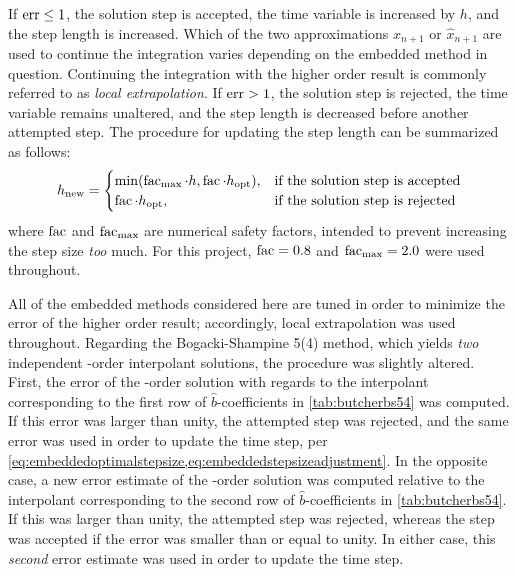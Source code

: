 If $\operatorname{err}\leq1$, the solution step is accepted, the time variable is increased
by $h$, and the step length is increased. Which of the two approximations
$x_{n+1}$ or $\widehat{x}_{n+1}$ are used to continue the integration varies
depending on the embedded method in question. Continuing the integration with
the higher order result is commonly referred to as \emph{local extrapolation}.
If $\operatorname{err}>1$, the solution step is rejected, the time variable remains
unaltered, and the step length is decreased before another attempted step. The
procedure for updating the step length can be summarized as follows:
\begin{equation}
    \label{eq:embeddedstepsizeadjustment}
h_{\mathrm{new}}=\begin{cases}%
    \min(\facem_{\mathrm{max}}\cdot{}h,\facem\cdot{}h_{\mathrm{opt}}),&
\textnormal{if the solution step is accepted}\\
\facem\cdot{}h_{\mathrm{opt}},&\textnormal{if the solution step is rejected}%
\end{cases}
\end{equation}
where $\operatorname{fac}$ and $\operatorname{fac}_{\mathrm{max}}$ are numerical safety factors,
intended to prevent increasing the step size \emph{too} much. For this project,
$\operatorname{fac}=0.8$ and $\operatorname{fac}_{\mathrm{max}}=2.0$ were used throughout.

All of the embedded methods considered here are tuned in order to minimize
the error of the higher order result; accordingly, local extrapolation was
used throughout. Regarding the Bogacki-Shampine 5(4) method, which yields
\emph{two} independent -order interpolant solutions, the procedure was
slightly altered. First, the error of the -order solution with regards to
the interpolant corresponding to the first row of $\widehat{b}$-coefficients in
\cref{tab:butcherbs54} was computed. If this error was larger than unity,
the attempted step was rejected, and the same error was used in order to
update the time step, per
\cref{eq:embeddedoptimalstepsize,eq:embeddedstepsizeadjustment}. In the
opposite case, a new error estimate of the -order solution was computed
relative to the interpolant corresponding to the second row of
$\widehat{b}$-coefficients in \cref{tab:butcherbs54}. If this was larger than
unity, the attempted step was rejected, whereas the step was accepted if the
error was smaller than or equal to unity. In either case, this \emph{second}
error estimate was used in order to update the time step.

